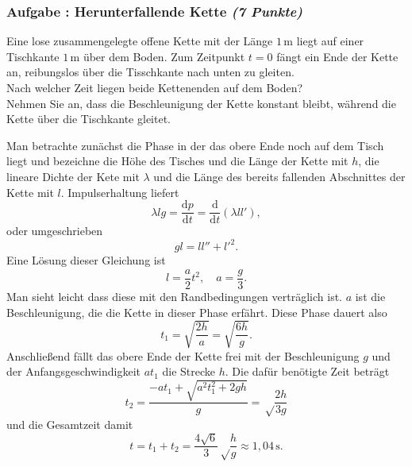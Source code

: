 \documentclass[12pt,a4paper]{article}
\newcommand{\unit}[1]{\,\mathrm{#1}}
\newcommand{\dif}{\mathrm{d}}
\newcommand{\tdif}[2]{\frac{\dif#1}{\dif#2}}
\newcounter{numlabel}
\newenvironment{problem}[2]{\stepcounter{numlabel} \vspace{1ex} \subsubsection*{Aufgabe \the\value{numlabel}: #1 \emph{(#2 Punkte)}} \renewcommand{\Currentlabel}{Aufgabe \the\value{numlabel}: #1}}{

}
\begin{document}
\begin{problem}{Herunterfallende Kette}{7}
Eine lose zusammengelegte offene Kette mit der Länge $1\unit{m}$ liegt auf einer Tischkante $1\unit{m}$ über dem Boden. Zum Zeitpunkt $t = 0$ fängt ein Ende der Kette an, reibungslos über die Tisschkante nach unten zu gleiten.\\
Nach welcher Zeit liegen beide Kettenenden auf dem Boden?\\
Nehmen Sie an, dass die Beschleunigung der Kette konstant bleibt, während die Kette über die Tischkante gleitet.
\begin{solution}
Man betrachte zunächst die Phase in der das obere Ende noch auf dem Tisch liegt und bezeichne die Höhe des Tisches und die Länge der Kette mit $h$, die lineare Dichte der Kete mit $\lambda$ und die Länge des bereits fallenden Abschnittes der Kette mit $l$. Impulserhaltung liefert
\[
\lambda l g = \tdif{p}{t}  = \tdif{}{t} (\lambda l l'),
\]
oder umgeschrieben
\[
g l = l l'' + l'^2.
\]
Eine Lösung dieser Gleichung ist
\[
l = \frac a2 t^2, \quad a = \frac g3.
\]
Man sieht leicht dass diese mit den Randbedingungen verträglich ist. $a$ ist die Beschleunigung, die die Kette in dieser Phase erfährt. Diese Phase dauert also
\[
t_1 = \sqrt{\frac{2 h}{a}} = \sqrt{\frac{6 h}{g}}.
\]
Anschließend fällt das obere Ende der Kette frei mit der Beschleunigung $g$ und der Anfangsgeschwindigkeit $a t_1$ die Strecke $h$. Die dafür benötigte Zeit beträgt
\[
t_2 = \frac{-at_1 + \sqrt{a^2 t_1^2 + 2 g h}}{g} = \sqrt\frac{2 h}{3 g}
\]
und die Gesamtzeit damit
\[
t = t_1 + t_2 = \frac{4 \sqrt 6}{3} \sqrt\frac{h}{g} \approx 1,04\unit{s}.
\]
\end{solution}
\end{problem}












\end{document}
